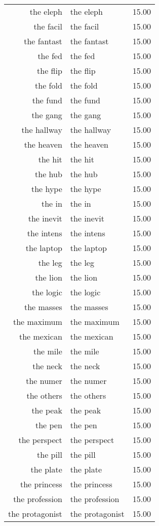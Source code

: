 \begin{table}[ht]
\begin{tabular}{rlr}
  the eleph & the eleph & 15.00 \\ 
  the facil & the facil & 15.00 \\ 
  the fantast & the fantast & 15.00 \\ 
  the fed & the fed & 15.00 \\ 
  the flip & the flip & 15.00 \\ 
  the fold & the fold & 15.00 \\ 
  the fund & the fund & 15.00 \\ 
  the gang & the gang & 15.00 \\ 
  the hallway & the hallway & 15.00 \\ 
  the heaven & the heaven & 15.00 \\ 
  the hit & the hit & 15.00 \\ 
  the hub & the hub & 15.00 \\ 
  the hype & the hype & 15.00 \\ 
  the in & the in & 15.00 \\ 
  the inevit & the inevit & 15.00 \\ 
  the intens & the intens & 15.00 \\ 
  the laptop & the laptop & 15.00 \\ 
  the leg & the leg & 15.00 \\ 
  the lion & the lion & 15.00 \\ 
  the logic & the logic & 15.00 \\ 
  the masses & the masses & 15.00 \\ 
  the maximum & the maximum & 15.00 \\ 
  the mexican & the mexican & 15.00 \\ 
  the mile & the mile & 15.00 \\ 
  the neck & the neck & 15.00 \\ 
  the numer & the numer & 15.00 \\ 
  the others & the others & 15.00 \\ 
  the peak & the peak & 15.00 \\ 
  the pen & the pen & 15.00 \\ 
  the perspect & the perspect & 15.00 \\ 
  the pill & the pill & 15.00 \\ 
  the plate & the plate & 15.00 \\ 
  the princess & the princess & 15.00 \\ 
  the profession & the profession & 15.00 \\ 
  the protagonist & the protagonist & 15.00 \\ 

\end{tabular}
\end{table}
